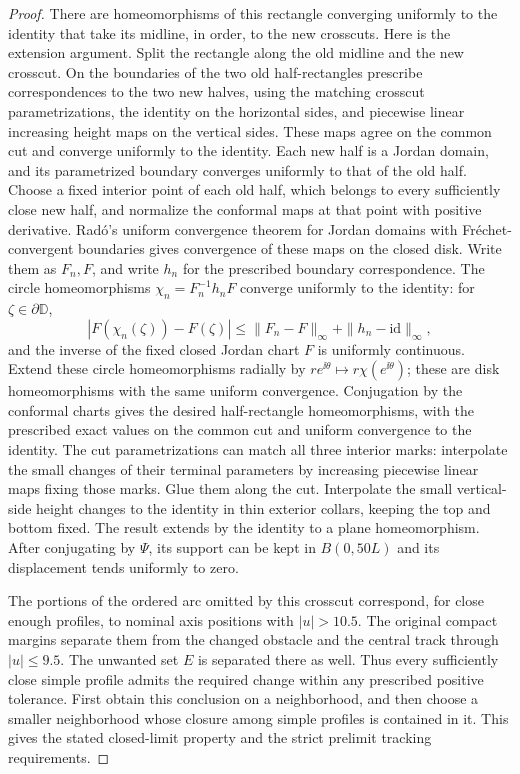 \begin{proof}
There are homeomorphisms of this rectangle converging uniformly to the
identity that take its midline, in order, to the new crosscuts.  Here
is the extension argument.  Split the rectangle along the old midline
and the new crosscut.  On the boundaries of the two old half-rectangles
prescribe correspondences to the two new halves, using the matching
crosscut parametrizations, the identity on the horizontal sides, and
piecewise linear increasing height maps on the vertical sides.  These
maps agree on the common cut and converge uniformly to the identity.
Each new half is a Jordan domain, and its parametrized boundary
converges uniformly to that of the old half.  Choose a fixed interior
point of each old half, which belongs to every sufficiently close new
half, and normalize the conformal maps at that point with positive
derivative.  Rad\'o's uniform convergence theorem for Jordan domains
with Fr\'echet-convergent boundaries
\cite[\S\S1--2, pp.~182--183]{Rado1923} gives convergence of these
maps on the closed disk.  Write them as $F_n,F$, and write $h_n$ for
the prescribed boundary correspondence.  The circle homeomorphisms
$\chi_n=F_n^{-1}h_nF$ converge uniformly to the identity: for
$\zeta\in\partial\mathbb D$,
\[
 |F(\chi_n(\zeta))-F(\zeta)|
       \le\|F_n-F\|_\infty+\|h_n-\mathrm{id}\|_\infty,
\]
and the inverse of the fixed closed Jordan chart $F$ is uniformly
continuous.  Extend these circle homeomorphisms radially by
$re^{\ii\theta}\mapsto r\chi(e^{\ii\theta})$; these are disk
homeomorphisms with the same uniform convergence.  Conjugation by the
conformal charts gives the desired half-rectangle homeomorphisms,
with the prescribed exact values on the common cut and uniform
convergence to the identity.  The cut parametrizations can match all
three interior marks: interpolate the small changes of their terminal
parameters by increasing piecewise linear maps fixing those marks.
Glue them along the cut.  Interpolate the small vertical-side height
changes to the identity in thin exterior collars, keeping the top and
bottom fixed.  The result extends by the identity to a plane
homeomorphism.  After conjugating by $\Psi$, its support can be kept in
$B(0,50L)$ and its displacement tends uniformly to zero.

The portions of the ordered arc omitted by this crosscut correspond,
for close enough profiles, to nominal axis positions with
$|u|>10.5$.  The original compact margins separate them from the changed
obstacle and the central track through $|u|\le9.5$.  The unwanted set
$E$ is separated there as well.  Thus every sufficiently close simple
profile admits the required change within any prescribed positive
tolerance.  First obtain this conclusion on a neighborhood, and then
choose a smaller neighborhood whose closure among simple profiles is
contained in it.  This gives the stated closed-limit property and the
strict prelimit tracking requirements.


\end{proof}
